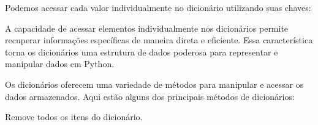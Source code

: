 \documentclass[letterpaper,10pt,english]{jupyterBook}
\begin{document}
\sphinxAtStartPar
{}

\sphinxAtStartPar
Podemos acessar cada valor individualmente no dicionário utilizando suas chaves:

\begin{sphinxVerbatim}[commandchars=\\\{\}]
  \PYG{p}{[}\PYG{p}{]}
 

  \PYG{p}{[}\PYG{p}{]}
 

  \PYG{p}{[}\PYG{p}{]}
 
\end{sphinxVerbatim}

\sphinxAtStartPar
A capacidade de acessar elementos individualmente nos dicionários permite recuperar informações específicas de maneira direta e eficiente. Essa característica torna os dicionários uma estrutura de dados poderosa para representar e manipular dados em Python.

\sphinxAtStartPar
Os dicionários oferecem uma variedade de métodos para manipular e acessar os dados armazenados. Aqui estão alguns dos principais métodos de dicionários:

\sphinxAtStartPar
{}
Remove todos os itens do dicionário.
\end{document}

